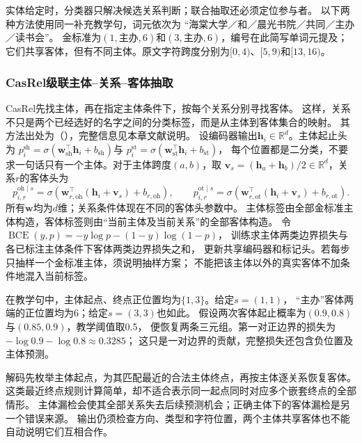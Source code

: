 实体给定时，分类器只解决候选关系判断；联合抽取还必须定位参与者。
以下两种方法使用同一补充教学句，词元依次为
“海棠大学／和／晨光书院／共同／主办／读书会”。
金标准为$(1,\text{主办},6)$和$(3,\text{主办},6)$，编号在此简写单词元提及；
它们共享客体，但有不同主体。原文字符跨度分别为$[0,4)$、$[5,9)$和$[13,16)$。

\subsubsection{CasRel级联主体--关系--客体抽取}
\label{sec:nlp-extraction-casrel}

CasRel先找主体，再在指定主体条件下，按每个关系分别寻找客体。
这样，关系不只是两个已经选好的名字之间的分类标签，而是从主体到客体集合的映射。
其方法出处为\citeauthor{wei2020casrel}（\citeyear{wei2020casrel}），完整信息见本章文献说明。
设编码器输出$\bm{h}_i\in\mathbb{R}^{d}$。主体起止头为
$p_i^{\mathrm{sh}}=\sigma(\bm{w}_{\mathrm{sh}}^\top\bm{h}_i+b_{\mathrm{sh}})$与
$p_i^{\mathrm{st}}=\sigma(\bm{w}_{\mathrm{st}}^\top\bm{h}_i+b_{\mathrm{st}})$，
每个位置都是二分类，不要求一句话只有一个主体。对于主体跨度$(a,b)$，取
$\bm{v}_s=(\bm{h}_a+\bm{h}_b)/2\in\mathbb{R}^{d}$，关系$r$的客体头为
\begin{equation}
  p_{i,r}^{\mathrm{oh}\mid s}
  =\sigma\!\left(\bm{w}_{r,\mathrm{oh}}^\top
       (\bm{h}_i+\bm{v}_s)+b_{r,\mathrm{oh}}\right),
  \qquad
  p_{i,r}^{\mathrm{ot}\mid s}
  =\sigma\!\left(\bm{w}_{r,\mathrm{ot}}^\top
       (\bm{h}_i+\bm{v}_s)+b_{r,\mathrm{ot}}\right).
  \label{eq:nlp-extraction-casrel}
\end{equation}
所有$\bm{w}$均为$d$维；关系条件体现在不同的客体头参数中。
主体标签由全部金标准主体构造，客体标签则由“当前主体及当前关系”的全部客体构造。
令$\operatorname{BCE}(y,p)=-y\log p-(1-y)\log(1-p)$，
训练求主体两类边界损失与各已标注主体条件下客体两类边界损失之和，
更新共享编码器和标记头。若每步只抽样一个金标准主体，须说明抽样方案；
不能把该主体以外的真实客体不加条件地混入当前标签。

在教学句中，主体起点、终点正位置均为$\{1,3\}$。给定$s=(1,1)$，
“主办”客体两端的正位置均为6；给定$s=(3,3)$也如此。
假设两次客体起止概率为$(0.9,0.8)$与$(0.85,0.9)$，教学阈值取0.5，
便恢复两条三元组。第一对正边界的损失为$-\log0.9-\log0.8\approx0.3285$；
这只是一对边界的贡献，完整损失还包含负位置及主体预测。

解码先枚举主体起点，为其匹配最近的合法主体终点，再按主体逐关系恢复客体。
这类最近终点规则计算简单，却不适合表示同一起点同时对应多个嵌套终点的全部情形。
主体漏检会使其全部关系失去后续预测机会；正确主体下的客体漏检是另一个错误来源。
输出仍须检查方向、类型和字符位置，两个主体共享客体也不能自动说明它们互相合作。


